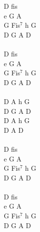 \documentclass[a5paper, 10pt]{book}
\begin{document}
\begin{minipage}[t]{0.25\textwidth}
  D fis\\
  e G A\\
  G Fis$^7$ h G\\
  D G A D\\
  \\
  D fis\\
  e G A\\
  G Fis$^7$ h G\\
  D G A D\\
  \\
  D A h G\\
  D G A D\\
  D A h G\\
  D A D\\
  \\
  D fis\\
  e G A\\
  G Fis$^7$ h G\\
  D G A D\\
  \\
  D fis\\
  e G A\\
  G Fis$^7$ h G\\
  D G A D\\
\end{minipage}

\newpage
\end{document}
